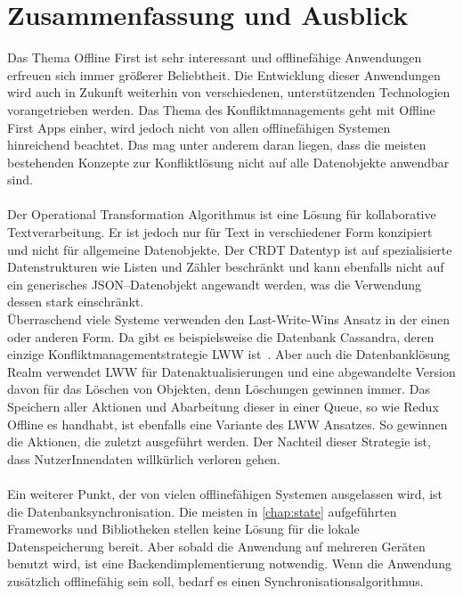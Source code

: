 \chapter{\label{chap:fazit}Zusammenfassung und Ausblick}
Das Thema Offline First ist sehr interessant und offlinefähige Anwendungen erfreuen sich immer größerer Beliebtheit.
Die Entwicklung dieser Anwendungen wird auch in Zukunft weiterhin von verschiedenen, unterstützenden Technologien vorangetrieben werden.
Das Thema des Konfliktmanagements geht mit Offline First \glspl{App} einher, wird jedoch nicht von allen offlinefähigen Systemen hinreichend beachtet.
Das mag unter anderem daran liegen, dass die meisten bestehenden Konzepte zur Konfliktlösung nicht auf alle Datenobjekte anwendbar sind.\\\\
Der Operational Transformation Algorithmus ist eine Lösung für kollaborative Textverarbeitung. Er ist jedoch nur für Text in verschiedener Form konzipiert und nicht für allgemeine Datenobjekte.
Der \gls{CRDT} Datentyp ist auf spezialisierte Datenstrukturen wie Listen und Zähler beschränkt und kann ebenfalls nicht auf ein generisches \gls{JSON}--Datenobjekt angewandt werden, was die Verwendung dessen stark einschränkt.\\
Überraschend viele Systeme verwenden den Last-Write-Wins Ansatz in der einen oder anderen Form.
Da gibt es beispielsweise die Datenbank Cassandra, deren einzige Konfliktmanagementstrategie \gls{LWW} ist~\cite{cassandralww}.
Aber auch die Datenbanklösung Realm verwendet \gls{LWW} für Datenaktualisierungen und eine abgewandelte Version davon für das Löschen von Objekten, denn Löschungen gewinnen immer.
Das Speichern aller Aktionen und Abarbeitung dieser in einer \gls{Queue}, so wie Redux Offline es handhabt, ist ebenfalls eine Variante des \gls{LWW} Ansatzes.
So gewinnen die Aktionen, die zuletzt ausgeführt werden.
Der Nachteil dieser Strategie ist, dass NutzerInnendaten willkürlich verloren gehen.\\\\
%
%
%
Ein weiterer Punkt, der von vielen offlinefähigen Systemen ausgelassen wird, ist die Datenbanksynchronisation.
Die meisten in \autoref{chap:state} aufgeführten Frameworks und Bibliotheken stellen keine Lösung für die lokale Datenspeicherung bereit. 
Aber sobald die Anwendung auf mehreren Geräten benutzt wird, ist eine Backendimplementierung notwendig.
Wenn die Anwendung zusätzlich offlinefähig sein soll, bedarf es einen Synchronisationsalgorithmus.
